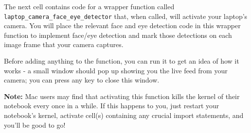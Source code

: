 \documentclass[11pt]{article}
\begin{document}
The next cell contains code for a wrapper function called
\texttt{laptop\_camera\_face\_eye\_detector} that, when called, will
activate your laptop's camera. You will place the relevant face and eye
detection code in this wrapper function to implement face/eye detection
and mark those detections on each image frame that your camera captures.

Before adding anything to the function, you can run it to get an idea of
how it works - a small window should pop up showing you the live feed
from your camera; you can press any key to close this window.

\textbf{Note:} Mac users may find that activating this function kills
the kernel of their notebook every once in a while. If this happens to
you, just restart your notebook's kernel, activate cell(s) containing
any crucial import statements, and you'll be good to go!
\end{document}
